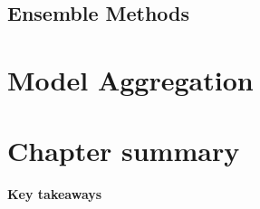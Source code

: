     \subsection{Ensemble Methods}
        \blindtext[1]

\section{Model Aggregation}
    \blindtext[1]

\section{Chapter summary}
    \begin{mdframed}[style=plainSty,innertopmargin=8pt] %
        {\center \textbf{\sffamily Key takeaways} \par}
        \noindent 
        \blindtext[1]
    \end{mdframed}